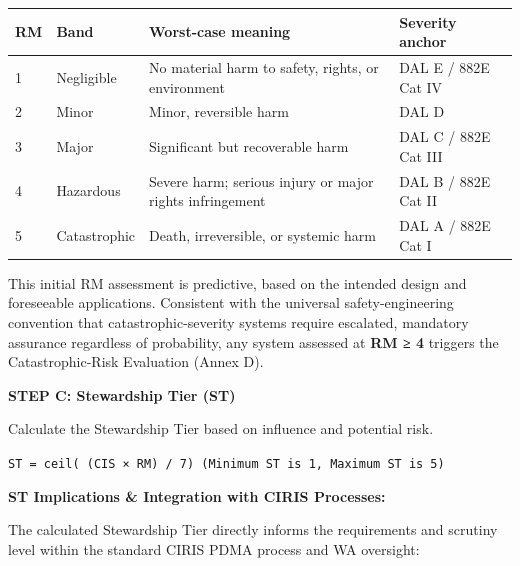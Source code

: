\documentclass[11pt]{article}
\begin{document}
{\scriptsize
\begin{longtable}{|p{4.0cm}|p{4.0cm}|p{4.0cm}|p{4.0cm}|}\hline
\textbf{RM} & \textbf{Band} & \textbf{Worst-case meaning} & \textbf{Severity anchor} \\ \hline\endhead
1 & Negligible & No material harm to safety, rights, or environment & DAL E / 882E Cat IV \\ \hline
2 & Minor & Minor, reversible harm & DAL D \\ \hline
3 & Major & Significant but recoverable harm & DAL C / 882E Cat III \\ \hline
4 & Hazardous & Severe harm; serious injury or major rights infringement & DAL B / 882E Cat II \\ \hline
5 & Catastrophic & Death, irreversible, or systemic harm & DAL A / 882E Cat I \\ \hline
\end{longtable}}


This initial RM assessment is predictive, based on the intended design and foreseeable applications. Consistent with the universal safety-engineering convention that catastrophic-severity systems require escalated, mandatory assurance regardless of probability, any system assessed at \textbf{RM ≥ 4} triggers the Catastrophic-Risk Evaluation (Annex D).


\textbf{STEP C: Stewardship Tier (ST)}

Calculate the Stewardship Tier based on influence and potential risk.


\texttt{ST = ceil( (CIS × RM) / 7) (Minimum ST is 1, Maximum ST is 5)}


\textbf{ST Implications \& Integration with CIRIS Processes:}

The calculated Stewardship Tier directly informs the requirements and scrutiny level within the standard CIRIS PDMA process and WA oversight:
\end{document}
